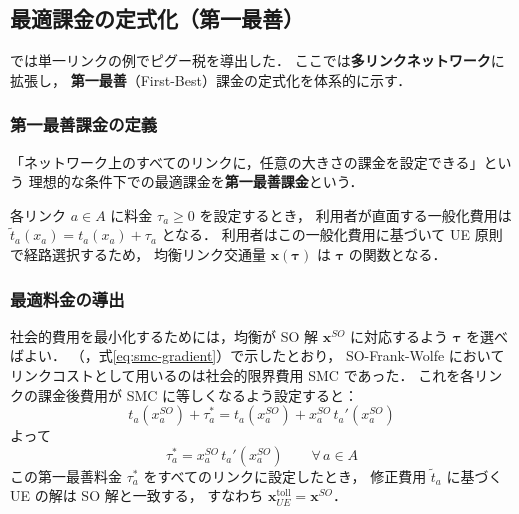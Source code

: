 \subsection{最適課金の定式化（第一最善）}
\label{subsec:first-best}

  では単一リンクの例でピグー税を導出した．
ここでは\textbf{多リンクネットワーク}に拡張し，
\textbf{第一最善}（First-Best）課金の定式化を体系的に示す\cite{Sheffi1985,土木学会1998}．

\subsubsection*{第一最善課金の定義}

「ネットワーク上のすべてのリンクに，任意の大きさの課金を設定できる」という
理想的な条件下での最適課金を\textbf{第一最善課金}という．

各リンク $a \in A$ に料金 $\tau_a \geq 0$ を設定するとき，
利用者が直面する一般化費用は $\tilde{t}_a(x_a) = t_a(x_a) + \tau_a$ となる．
利用者はこの一般化費用に基づいて UE 原則で経路選択するため，
均衡リンク交通量 $\boldsymbol{x}(\boldsymbol{\tau})$ は $\boldsymbol{\tau}$ の関数となる．

\subsubsection*{最適料金の導出}

社会的費用を最小化するためには，均衡が SO 解 $\boldsymbol{x}^{SO}$ に対応するよう
$\boldsymbol{\tau}$ を選べばよい．
（，式\eqref{eq:smc-gradient}）で示したとおり，
SO-Frank-Wolfe においてリンクコストとして用いるのは社会的限界費用 SMC であった．
これを各リンクの課金後費用が SMC に等しくなるよう設定すると：
\begin{equation}
  t_a(x_a^{SO}) + \tau_a^* = t_a(x_a^{SO}) + x_a^{SO}\, t_a'(x_a^{SO})
\end{equation}
よって
\begin{equation}
  \boxed{
    \tau_a^* = x_a^{SO}\, t_a'(x_a^{SO})
    \qquad \forall\, a \in A
  }
  \label{eq:first-best-toll}
\end{equation}
この第一最善料金 $\tau_a^*$ をすべてのリンクに設定したとき，
修正費用 $\tilde{t}_a$ に基づく UE の解は SO 解と一致する，
すなわち $\boldsymbol{x}_{UE}^{\text{toll}} = \boldsymbol{x}^{SO}$\cite{Beckmann1956}．

